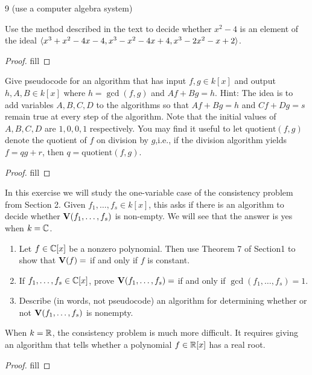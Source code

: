 \begin{exercise}{9}
9 (use a computer algebra system)

Use the method described in the text to decide whether $x^2-4$ is an element of the ideal $\langle x^3+x^2-4x-4, x^3-x^2-4x+4,x^3-2x^2-x+2\rangle$.
\end{exercise}
\begin{proof}
fill
\end{proof}

\begin{exercise}{10}
Give pseudocode for an algorithm that has input $f,g\in k[x]$ and output $h,A,B\in k[x]$ where $h =\gcd(f,g)$ and $Af+Bg=h$. Hint: The idea is to add variables $A,B,C,D$ to the algorithms so that $Af+Bg =h$ and $Cf+Dg =s$ remain true at every step of the algorithm. Note that the initial values of $A,B,C,D$ are $1,0,0,1$ respectively. You may find it useful to let $\text{quotient}(f,g)$ denote the quotient of $f$ on division by $g$,i.e., if the division algorithm yields $f =qg+r$, then $q =\text{quotient}(f,g)$.
\end{exercise}
\begin{proof}
fill
\end{proof}

\begin{exercise}{11}
In this exercise we will study the one-variable case of the consistency problem from Section 2. Given $f_1,\dots,f_s\in k[x]$, this asks if there is an algorithm to decide whether $\mathbf{V}(f_1,\dots,f_s)$ is non-empty. We will see that the answer is yes when $k=\mathbb{C}$.
\begin{enumerate}
    \item Let $f\in\mathbb{C}[x]$ be a nonzero polynomial. Then use Theorem 7 of Section1 to show that $\bV(f) =\empty$ if and only if $f$ is constant.
    \item If $f_1,\dots,f_s\in\mathbb{C}[x]$, prove $\bV(f_1,\dots,f_s) =\empty$ if and only if $\gcd(f_1,\dots,f_s) =1$.
    \item Describe (in words, not pseudocode) an algorithm for determining whether or not $\mathbf{V}(f_1,\dots,f_s)$ is nonempty.
\end{enumerate}
When $k=\mathbb{R}$, the consistency problem is much more difficult. It requires giving an algorithm that tells whether a polynomial $f\in\mathbb{R}[x]$ has a real root.
\end{exercise}
\begin{proof}
fill
\end{proof}

